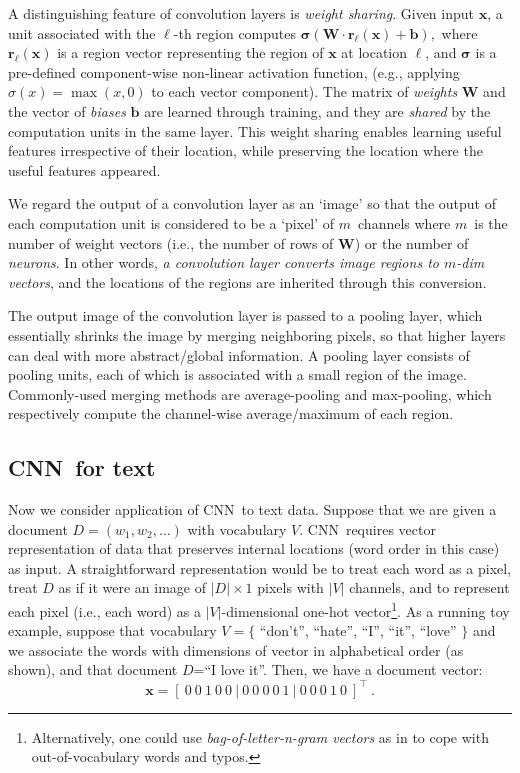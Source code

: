 \documentclass[11pt,letterpaper]{article}
\newcommand{\cnn}{CNN}
\newcommand{\bx}{{\mathbf x}}
\newcommand{\doc}{D}
\newcommand{\voc}{V}
\newcommand{\vsz}{|\voc|}
\newcommand{\wrd}{w}
\newcommand{\dsz}{|\doc|}
\newcommand{\Activ}{\boldsymbol{\sigma}}
\newcommand{\activ}{\sigma}
\newcommand{\ip}[2]{{#1} \cdot {#2}} \newcommand{\Ip}[2]{{#1} \cdot {#2}}
\newcommand{\Wei}{{\mathbf W}}
\newcommand{\Bias}{{\mathbf b}}
\newcommand{\region}{{\mathbf r}} \newcommand{\iL}{\ell} \newcommand{\nL}{L}
\begin{document}
A distinguishing feature of convolution layers is {\em weight sharing}. 
Given input $\bx$, a unit associated with the $\iL$-th region computes 
$
\Activ(\ip{\Wei}{\region_\iL(\bx)}+\Bias), 
$
where $\region_\iL(\bx)$ is a region vector representing the region of $\bx$ 
at location $\ell$, 
and $\Activ$ is a pre-defined component-wise non-linear activation function, 
(e.g., applying $\activ(x)=\max(x,0)$ to each vector component).  
The matrix of {\em weights} $\Wei$ and the vector of {\em biases} $\Bias$ are 
learned through training, and they are {\em shared} by the computation units 
in the same layer.  
This weight sharing enables learning 
useful features irrespective of their location, while preserving the 
location where the useful features appeared.  

\newcommand{\numNeurono}{m}
\newcommand{\numNeuron}{$\numNeurono$}
We regard the output of a convolution layer as an `image' so that the output of 
each computation unit is considered to be a `pixel' of \numNeuron\ channels 
where \numNeuron\ is the number of weight vectors (i.e., the number of 
rows of $\Wei$) or the number of {\em neurons}. 
In other words, {\em a convolution layer converts image regions to 
\numNeuron-dim vectors}, and the locations of the regions are inherited through this conversion.  


The output image of the convolution layer is passed to a pooling layer, 
which essentially shrinks the image by merging neighboring pixels, so that higher layers can deal with 
more abstract/global information.  
A pooling layer consists of pooling units, each of which is associated with a small region 
of the image.  Commonly-used merging methods are average-pooling and max-pooling, 
which respectively compute the channel-wise average/maximum of each region.  






\subsection{\cnn\ for text} 
\label{sec:cnn-text}

Now we consider application of \cnn\ to text data.  
Suppose that we are given a document $\doc=(\wrd_1, \wrd_2, \ldots)$ with vocabulary 
$\voc$.  
\cnn\ requires vector representation of data that preserves internal locations (word order in this case) 
as input.  
A straightforward representation 
would be to treat each word as a pixel, treat 
$\doc$ as if it were an image of $\dsz \times 1$ pixels with $\vsz$ channels, 
and to represent each pixel (i.e., each word) as a $\vsz$-dimensional one-hot vector\footnote{
  Alternatively, one could use {\em bag-of-letter-n-gram vectors} as in \cite{Shen+etal14,Gao+etal14} 
  to cope with out-of-vocabulary words and typos.  
}. 
As a running toy example, 
suppose that vocabulary $\voc=\{$ ``don't'', ``hate'', ``I'', ``it'', ``love'' $\}$ 
and we associate the words with dimensions of vector in alphabetical order (as shown), 
and that document $\doc$=``I love it''.  
Then, we have a document vector: 
\vspace{-0.1in}
\[
  \bx=\left[~0~0~1~0~0~|~0~0~0~0~1~|~0~0~0~1~0~\right]^\top~. 
\]
\end{document}
